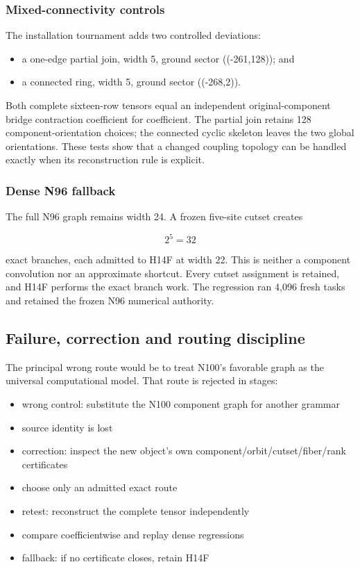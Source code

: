 \subsubsection{Mixed-connectivity
controls}\label{viii-ch01-mixed-connectivity-controls}

The installation tournament adds two controlled deviations:

\begin{itemize}
\tightlist
\item
  a one-edge partial join, width 5, ground sector ((-261,128)); and
\item
  a connected ring, width 5, ground sector ((-268,2)).
\end{itemize}

Both complete sixteen-row tensors equal an independent
original-component bridge contraction coefficient for coefficient. The
partial join retains 128 component-orientation choices; the connected
cyclic skeleton leaves the two global orientations. These tests show
that a changed coupling topology can be handled exactly when its
reconstruction rule is explicit.

\subsubsection{Dense N96 fallback}\label{viii-ch01-dense-n96-fallback}

The full N96 graph remains width 24. A frozen five-site cutset creates

\[
2^5=32
\]

exact branches, each admitted to H14F at width 22. This is neither a
component convolution nor an approximate shortcut. Every cutset
assignment is retained, and H14F performs the exact branch work. The
regression ran 4,096 fresh tasks and retained the frozen N96 numerical
authority.

\subsection{Failure, correction and routing
discipline}\label{viii-ch01-failure-correction-and-routing-discipline}

The principal wrong route would be to treat N100's favorable graph as
the universal computational model. That route is rejected in stages:

\begin{itemize}
\tightlist
\item
  wrong control: substitute the N100 component graph for another grammar
\item
  source identity is lost
\item
  correction: inspect the new object's own
  component/orbit/cutset/fiber/rank certificates
\item
  choose only an admitted exact route
\item
  retest: reconstruct the complete tensor independently
\item
  compare coefficientwise and replay dense regressions
\item
  fallback: if no certificate closes, retain H14F
\end{itemize}

